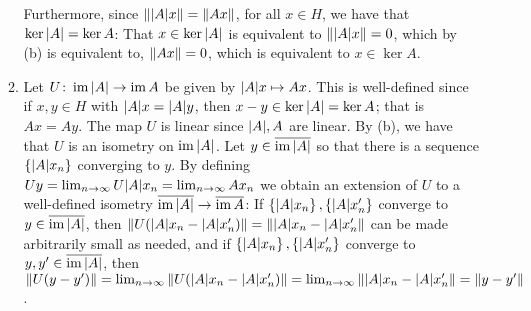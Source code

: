 \documentclass[11pt,leqno]{article}
\theoremstyle{plain}
\theoremstyle{definition}
\numberwithin{equation}{section}
\numberwithin{lem}{section}
\newcommand{\cbr}[1]{\left\{#1\right\}}
\DeclareMathOperator{\im}{im}
\begin{document}
\begin{enumerate}
\begin{enumerate}
        Furthermore, since $\norm{\abs{A}x} = \norm{Ax}$, for all $x\in H$, we have that $\ker \abs{A} = \ker A$: That $x\in \ker \abs{A}$ is equivalent to $\norm{\abs{A}x} = 0$, which by (b) is equivalent to, $\norm{Ax} = 0$, which is equivalent to $x\in \ker A$.
        \item Let $U\colon \im \abs{A}\to \im A$ be given by $\abs{A}x\mapsto Ax$. This is well-defined since if $x,y\in H$ with $\abs{A}x = \abs{A}y$, then $x-y\in \ker \abs{A} = \ker A$; that is $Ax = Ay$. The map $U$ is linear since $\abs{A},A$ are linear. By (b), we have that $U$ is an isometry on $\im \abs{A}$. Let $y\in \overline{\im \abs{A}}$ so that there is a sequence $\cbr{\abs{A}x_n}$ converging to $y$. By defining $Uy = \lim_{n\to\infty}U\abs{A}x_n = \lim_{n\to\infty}Ax_n$ we obtain an extension of $U$ to a well-defined isometry $\overline{\im \abs{A}}\to\overline{\im A}$: If $\cbr{\abs{A}x_n},\cbr{\abs{A}x^\prime_n}$ converge to $y\in\overline{\im \abs{A}}$, then $\norm{U(\abs{A}x_n-\abs{A}x^\prime_n)} = \norm{\abs{A}x_n-\abs{A}x^\prime_n}$ can be made arbitrarily small as needed, and if $\cbr{\abs{A}x_n},\cbr{\abs{A}x^\prime_n}$ converge to $y,y^\prime\in \overline{\im \abs{A}}$, then $\norm{U(y-y^\prime)} = \lim_{n\to\infty}\norm{U(\abs{A}x_n-\abs{A}x^\prime_n)} = \lim_{n\to\infty}\norm{\abs{A}x_n-\abs{A}x^\prime_n} = \norm{y-y^\prime}$.
        

\end{enumerate}
\end{enumerate}
\end{document}
